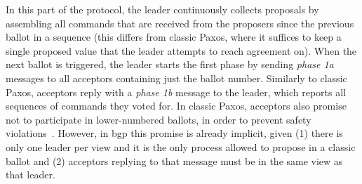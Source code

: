 In this part of the protocol, the leader continuously collects proposals by assembling all commands that are received from the proposers since the previous ballot in a sequence (this differs from classic Paxos, where it suffices to keep a single proposed value that the leader attempts to reach agreement on). When the next ballot is triggered, the leader starts the first phase by sending \textit{phase 1a} messages to all acceptors containing just the ballot number. Similarly to classic Paxos, acceptors reply with a \textit{phase 1b} message to the leader, which reports all sequences of commands they voted for. In classic Paxos, acceptors also promise not to participate in lower-numbered ballots, in order to prevent safety violations~\cite{Lamport:1998}. However, in \acrshort{bgp} this promise is already implicit, given (1) there is only one leader per view and it is the only process allowed to propose in a classic ballot and (2) acceptors replying to that message must be in the same view as that leader.


